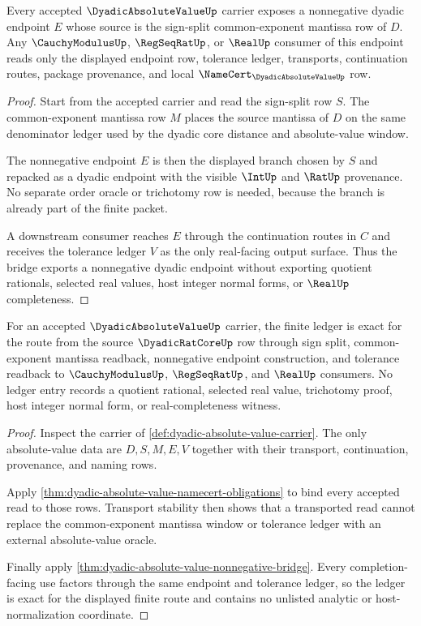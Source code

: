 \begin{theorem}
\label{thm:dyadic-absolute-value-nonnegative-bridge}
Every accepted $\DyadicAbsoluteValueUp$ carrier exposes a nonnegative dyadic endpoint $E$ whose source is the sign-split common-exponent mantissa row of $D$. Any $\CauchyModulusUp$, $\RegSeqRatUp$, or $\RealUp$ consumer of this endpoint reads only the displayed endpoint row, tolerance ledger, transports, continuation routes, package provenance, and local $\NameCert_{\DyadicAbsoluteValueUp}$ row.
\end{theorem}
\begin{proof}
Start from the accepted carrier and read the sign-split row $S$. The common-exponent mantissa row $M$ places the source mantissa of $D$ on the same denominator ledger used by the dyadic core distance and absolute-value window.

The nonnegative endpoint $E$ is then the displayed branch chosen by $S$ and repacked as a dyadic endpoint with the visible $\IntUp$ and $\RatUp$ provenance. No separate order oracle or trichotomy row is needed, because the branch is already part of the finite packet.

A downstream consumer reaches $E$ through the continuation routes in $C$ and receives the tolerance ledger $V$ as the only real-facing output surface. Thus the bridge exports a nonnegative dyadic endpoint without exporting quotient rationals, selected real values, host integer normal forms, or $\RealUp$ completeness.
\end{proof}

\begin{theorem}
\label{thm:dyadic-absolute-value-ledger-exactness}
For an accepted $\DyadicAbsoluteValueUp$ carrier, the finite ledger is exact for the route from the source $\DyadicRatCoreUp$ row through sign split, common-exponent mantissa readback, nonnegative endpoint construction, and tolerance readback to $\CauchyModulusUp$, $\RegSeqRatUp$, and $\RealUp$ consumers. No ledger entry records a quotient rational, selected real value, trichotomy proof, host integer normal form, or real-completeness witness.
\end{theorem}
\begin{proof}
Inspect the carrier of \autoref{def:dyadic-absolute-value-carrier}. The only absolute-value data are $D,S,M,E,V$ together with their transport, continuation, provenance, and naming rows.

Apply \autoref{thm:dyadic-absolute-value-namecert-obligations} to bind every accepted read to those rows. Transport stability then shows that a transported read cannot replace the common-exponent mantissa window or tolerance ledger with an external absolute-value oracle.

Finally apply \autoref{thm:dyadic-absolute-value-nonnegative-bridge}. Every completion-facing use factors through the same endpoint and tolerance ledger, so the ledger is exact for the displayed finite route and contains no unlisted analytic or host-normalization coordinate.
\end{proof}

